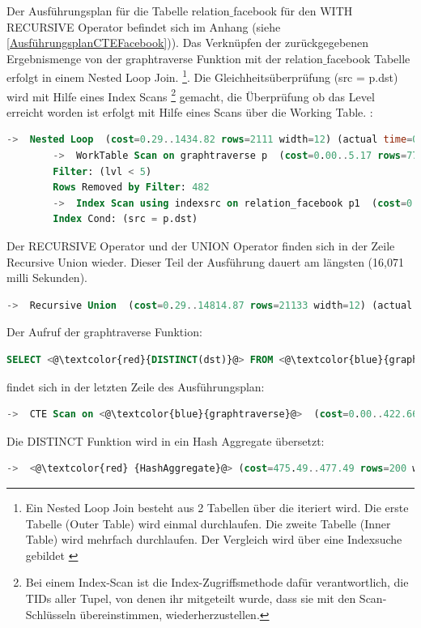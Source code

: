 Der Ausführungsplan für die Tabelle relation$\_$facebook für den WITH RECURSIVE Operator befindet sich im Anhang (siehe \ref{AusführungsplanCTEFacebook})).
Das Verknüpfen der zurückgegebenen Ergebnismenge von der graphtraverse Funktion mit der relation$\_$facebook Tabelle erfolgt in einem Nested Loop Join.
\footnote{Ein Nested Loop Join besteht aus 2 Tabellen über die iteriert wird. Die erste Tabelle (Outer Table) wird einmal durchlaufen. Die zweite
Tabelle (Inner Table) wird mehrfach durchlaufen. Der Vergleich wird über eine Indexsuche gebildet \cite[Seite 213]{froehlich01}}. Die Gleichheitsüberprüfung (src = p.dst)
wird mit Hilfe eines Index Scans \footnote{Bei einem Index-Scan ist die Index-Zugriffsmethode dafür verantwortlich, die \ac{TID}s aller Tupel, von denen ihr mitgeteilt wurde,
dass sie mit den Scan-Schlüsseln übereinstimmen, wiederherzustellen.} gemacht,
die Überprüfung ob das Level erreicht worden ist erfolgt mit Hilfe eines Scans über die Working Table. :
\begin{lstlisting}[language=SQL,caption = Überprüfung der WHERE Bedingung,frame=single, label={WhereConditionCTE} ]
    ->  Nested Loop  (cost=0.29..1434.82 rows=2111 width=12) (actual time=0.018..2.174 rows=8173 loops=5)
        ->  WorkTable Scan on graphtraverse p  (cost=0.00..5.17 rows=77 width=8) (actual time=0.016..0.065 rows=729 loops=5)
        Filter: (lvl < 5)
        Rows Removed by Filter: 482
        ->  Index Scan using indexsrc on relation_facebook p1  (cost=0.29..18.23 rows=27 width=8) (actual time=0.001..0.002 rows=11 loops=3645)
        Index Cond: (src = p.dst)
\end{lstlisting}
Der RECURSIVE Operator und der UNION Operator finden sich in der Zeile Recursive Union wieder. Dieser Teil der Ausführung dauert am längsten (16,071 milli Sekunden).
\begin{lstlisting}[language=SQL,caption = Überprüfung der WHERE Bedingung,frame=single, label={WhereConditionCTE} ]
    ->  Recursive Union  (cost=0.29..14814.87 rows=21133 width=12) (actual time=0.014..16.085 rows=6056 loops=1)
\end{lstlisting}
Der Aufruf der graphtraverse Funktion:
\begin{lstlisting}[language=SQL,caption = Aufruf der graphtraverse Funktion,frame=single, label={WhereConditionCTE} ]
    SELECT <@\textcolor{red}{DISTINCT(dst)}@> FROM <@\textcolor{blue}{graphtraverse}@> order by dst
\end{lstlisting}
findet sich in der letzten Zeile des Ausführungsplan:
\begin{lstlisting}[language=SQL,caption = Aufruf der graphtraverse Funktion im Ausführungsplan,frame=single, label={functionCallGraphtraverse} ]
    ->  CTE Scan on <@\textcolor{blue}{graphtraverse}@>  (cost=0.00..422.66 rows=21133 width=4) (actual time=0.015..16.921 rows=6056 loops=1)
\end{lstlisting}
Die DISTINCT Funktion wird in ein Hash Aggregate übersetzt:
\begin{lstlisting}[language=SQL,caption = Aufruf der DISTINCT Funktion,frame=single, label={WhereConditionCTE} ]
    ->  <@\textcolor{red} {HashAggregate}@> (cost=475.49..477.49 rows=200 width=4) (actual time=17.694..17.716 rows=321 loops=1)
\end{lstlisting}
